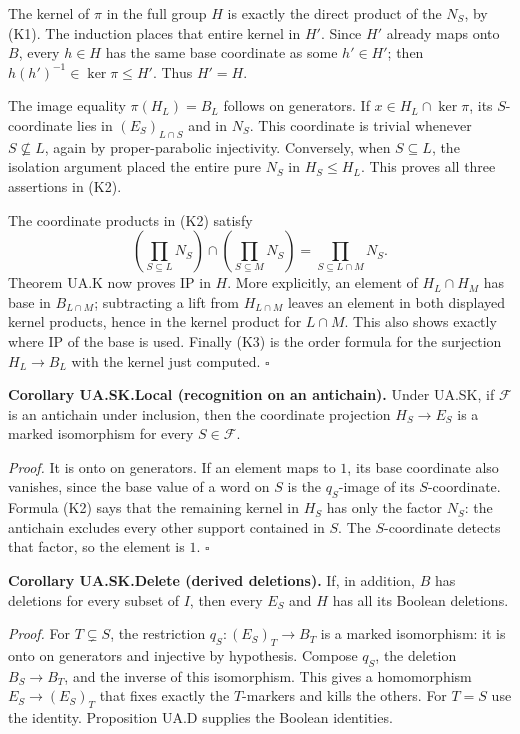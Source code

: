 \documentclass[
  11pt,
  a4paper,
]{article}
\begin{document}
The kernel of \(\pi\) in the full group \(H\) is exactly the direct
product of the \(N_S\), by (K1). The induction places that entire kernel
in \(H'\). Since \(H'\) already maps onto \(B\), every \(h\in H\) has
the same base coordinate as some \(h'\in H'\); then
\(h(h')^{-1}\in\ker\pi\leq H'\). Thus \(H'=H\).

The image equality \(\pi(H_L)=B_L\) follows on generators. If
\(x\in H_L\cap\ker\pi\), its \(S\)-coordinate lies in
\((E_S)_{L\cap S}\) and in \(N_S\). This coordinate is trivial whenever
\(S\not\subseteq L\), again by proper-parabolic injectivity. Conversely,
when \(S\subseteq L\), the isolation argument placed the entire pure
\(N_S\) in \(H_S\leq H_L\). This proves all three assertions in (K2).

The coordinate products in (K2) satisfy \[
\left(\prod_{S\subseteq L}N_S\right)\cap
\left(\prod_{S\subseteq M}N_S\right)
=\prod_{S\subseteq L\cap M}N_S.
\] Theorem UA.K now proves IP in \(H\). More explicitly, an element of
\(H_L\cap H_M\) has base in \(B_{L\cap M}\); subtracting a lift from
\(H_{L\cap M}\) leaves an element in both displayed kernel products,
hence in the kernel product for \(L\cap M\). This also shows exactly
where IP of the base is used. Finally (K3) is the order formula for the
surjection \(H_L\to B_L\) with the kernel just computed. \(\square\)

\textbf{Corollary UA.SK.Local (recognition on an antichain).} Under
UA.SK, if \(\mathcal F\) is an antichain under inclusion, then the
coordinate projection \(H_S\to E_S\) is a marked isomorphism for every
\(S\in\mathcal F\).

\emph{Proof.} It is onto on generators. If an element maps to \(1\), its
base coordinate also vanishes, since the base value of a word on \(S\)
is the \(q_S\)-image of its \(S\)-coordinate. Formula (K2) says that the
remaining kernel in \(H_S\) has only the factor \(N_S\): the antichain
excludes every other support contained in \(S\). The \(S\)-coordinate
detects that factor, so the element is \(1\). \(\square\)

\textbf{Corollary UA.SK.Delete (derived deletions).} If, in addition,
\(B\) has deletions for every subset of \(I\), then every \(E_S\) and
\(H\) has all its Boolean deletions.

\emph{Proof.} For \(T\subsetneq S\), the restriction
\(q_S:(E_S)_T\to B_T\) is a marked isomorphism: it is onto on generators
and injective by hypothesis. Compose \(q_S\), the deletion
\(B_S\to B_T\), and the inverse of this isomorphism. This gives a
homomorphism \(E_S\to(E_S)_T\) that fixes exactly the \(T\)-markers and
kills the others. For \(T=S\) use the identity. Proposition UA.D
supplies the Boolean identities.
\end{document}
